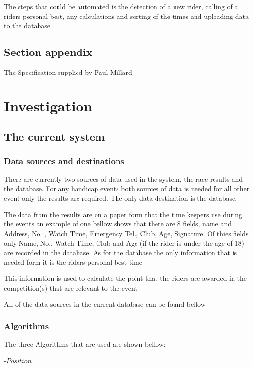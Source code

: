 The steps that could be automated is the detection of a new rider, calling of a riders personal best, any calculations and sorting of the times and uploading data to the database
\subsection{Section appendix}

The Specification supplied by Paul Millard

\section{Investigation}

\subsection{The current system}

\subsubsection{Data sources and destinations}
There are currently two sources of data used in the system, the race results and the database. For any handicap events both sources of data is needed for all other event only the results are required. The only data destination is the database.

The data from the results are on a paper form that the time keepers use during the events an example of one bellow shows that there are 8 fields, name and Address, No. , Watch Time, Emergency Tel., Club, Age, Signature. Of thies fields only Name, No., Watch Time, Club and Age (if the rider is under the age of 18) are recorded in the database. As for the database the only information that is needed form it is the riders personal best time

This information is used to calculate the point that the riders are awarded in the competition(s) that are relevant to the event

All of the data sources in the current database can be found bellow




\subsubsection{Algorithms}
The three Algorithms that are used are shown bellow:

\begin{algorithm}[H]
\label{fig:Ride Time Algorithm}
	\caption{$Ride Time Algorithum$}
\begin{algorithmic}[1]
-{$Position$}
\end{algorithmic}
\end{algorithm}

